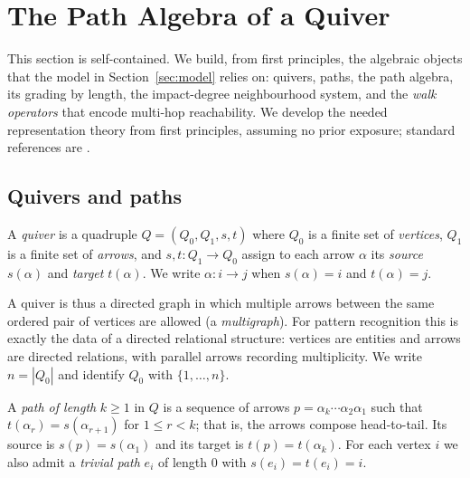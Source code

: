 \section{The Path Algebra of a Quiver}\label{sec:algebra}

This section is self-contained. We build, from first principles, the algebraic
objects that the model in Section~\ref{sec:model} relies on: quivers, paths, the
path algebra, its grading by length, the impact-degree neighbourhood system, and
the \emph{walk operators} that encode multi-hop reachability. We develop the
needed representation theory from first principles, assuming no prior exposure;
standard references are \cite{schiffler2014quiver,assem2006elements}.

\subsection{Quivers and paths}

\begin{definition}[Quiver]
A \emph{quiver} is a quadruple $Q=(Q_0,Q_1,s,t)$ where $Q_0$ is a finite set of
\emph{vertices}, $Q_1$ is a finite set of \emph{arrows}, and
$s,t\colon Q_1\to Q_0$ assign to each arrow $\alpha$ its \emph{source}
$s(\alpha)$ and \emph{target} $t(\alpha)$. We write $\alpha\colon i\to j$ when
$s(\alpha)=i$ and $t(\alpha)=j$.
\end{definition}

A quiver is thus a directed graph in which multiple arrows between the same
ordered pair of vertices are allowed (a \emph{multigraph}). For pattern
recognition this is exactly the data of a directed relational structure: vertices
are entities and arrows are directed relations, with parallel arrows recording
multiplicity. We write $n=|Q_0|$ and identify $Q_0$ with $\{1,\dots,n\}$.

\begin{definition}[Path]
A \emph{path of length} $k\ge 1$ in $Q$ is a sequence of arrows
$p=\alpha_k\cdots\alpha_2\alpha_1$ such that $t(\alpha_r)=s(\alpha_{r+1})$ for
$1\le r<k$; that is, the arrows compose head-to-tail. Its source is
$s(p)=s(\alpha_1)$ and its target is $t(p)=t(\alpha_k)$. For each vertex $i$ we
also admit a \emph{trivial path} $e_i$ of length $0$ with $s(e_i)=t(e_i)=i$.
\end{definition}


